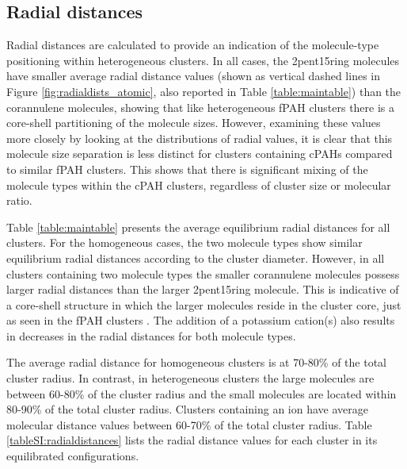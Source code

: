 \subsection{Radial distances}

Radial distances are calculated to provide an indication of the molecule-type positioning within heterogeneous clusters. In all cases, the 2pent15ring molecules have smaller average radial distance values (shown as vertical dashed lines in Figure \ref{fig:radialdists_atomic}, also reported in Table \ref{table:maintable}) than the corannulene molecules, showing that like heterogeneous fPAH clusters \cite{bowal2018partitioning} there is a core-shell partitioning of the molecule sizes. 
However, examining these values more closely by looking at the distributions of radial values, it is clear that this molecule size separation is less distinct for clusters containing cPAHs compared to similar fPAH clusters. This shows that there is significant mixing of the molecule types within the cPAH clusters, regardless of cluster size or molecular ratio.

Table \ref{table:maintable} presents the average equilibrium radial distances for all clusters. For the homogeneous cases, the two molecule types show similar equilibrium radial distances according to the cluster diameter. However, in all clusters containing two molecule types the smaller corannulene molecules possess larger radial distances than the larger 2pent15ring molecule. This is indicative of a core-shell structure in which the larger molecules reside in the cluster core, just as seen in the fPAH clusters \cite{bowal2018partitioning}.
The addition of a potassium cation(s) also results in decreases in the radial distances for both molecule types.

The average radial distance for homogeneous clusters is at 70-80\% of the total cluster radius. In contrast, in heterogeneous clusters the large molecules are between 60-80\% of the cluster radius and the small molecules are located within 80-90\% of the total cluster radius.  Clusters containing an ion have average molecular distance values between 60-70\% of the total cluster radius. %
Table \ref{tableSI:radialdistances} lists the radial distance values for each cluster in its equilibrated configurations.

